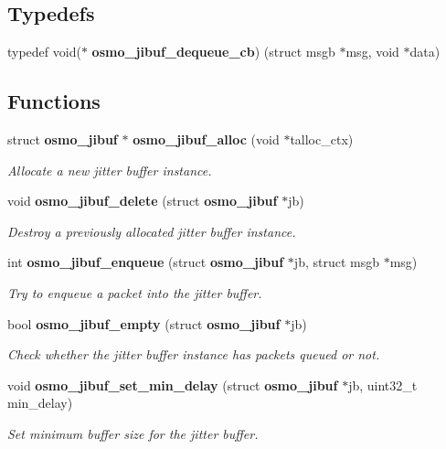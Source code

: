 \subsection*{Typedefs}
\begin{DoxyCompactItemize}
\item 
typedef void($\ast$ {\bfseries osmo\+\_\+jibuf\+\_\+dequeue\+\_\+cb}) (struct msgb $\ast$msg, void $\ast$data)\label{group__jibuf_ga78eb735a1f6c3dd8b6478ded3db60652}

\end{DoxyCompactItemize}
\subsection*{Functions}
\begin{DoxyCompactItemize}
\item 
struct {\bf osmo\+\_\+jibuf} $\ast$ {\bf osmo\+\_\+jibuf\+\_\+alloc} (void $\ast$talloc\+\_\+ctx)
\begin{DoxyCompactList}\small\item\em Allocate a new jitter buffer instance. \end{DoxyCompactList}\item 
void {\bf osmo\+\_\+jibuf\+\_\+delete} (struct {\bf osmo\+\_\+jibuf} $\ast$jb)
\begin{DoxyCompactList}\small\item\em Destroy a previously allocated jitter buffer instance. \end{DoxyCompactList}\item 
int {\bf osmo\+\_\+jibuf\+\_\+enqueue} (struct {\bf osmo\+\_\+jibuf} $\ast$jb, struct msgb $\ast$msg)
\begin{DoxyCompactList}\small\item\em Try to enqueue a packet into the jitter buffer. \end{DoxyCompactList}\item 
bool {\bf osmo\+\_\+jibuf\+\_\+empty} (struct {\bf osmo\+\_\+jibuf} $\ast$jb)
\begin{DoxyCompactList}\small\item\em Check whether the jitter buffer instance has packets queued or not. \end{DoxyCompactList}\item 
void {\bf osmo\+\_\+jibuf\+\_\+set\+\_\+min\+\_\+delay} (struct {\bf osmo\+\_\+jibuf} $\ast$jb, uint32\+\_\+t min\+\_\+delay)
\begin{DoxyCompactList}\small\item\em Set minimum buffer size for the jitter buffer. \end{DoxyCompactList}\item 

\end{DoxyCompactItemize}
